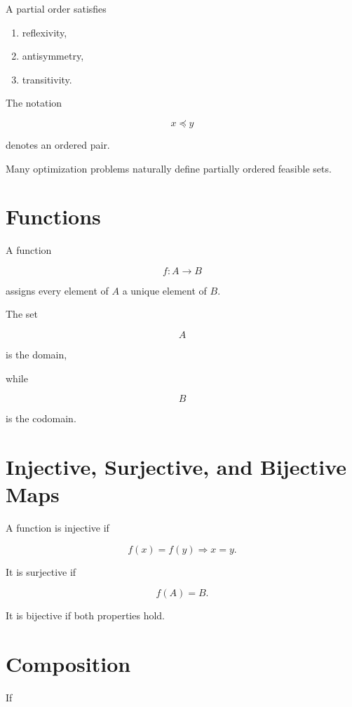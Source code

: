 \documentclass[11pt,fleqn]{book}
\numberwithin{equation}{chapter}
\theoremstyle{plain}
\theoremstyle{definition}
\theoremstyle{remark}
\begin{document}
A partial order satisfies

\begin{enumerate}
\item reflexivity,
\item antisymmetry,
\item transitivity.
\end{enumerate}

The notation

\[
x\preceq y
\]

denotes an ordered pair.

Many optimization problems naturally define partially ordered feasible
sets.


\section{Functions}

A function

\[
f:A\rightarrow B
\]

assigns every element of $A$ a unique element of $B$.

The set

\[
A
\]

is the domain,

while

\[
B
\]

is the codomain.


\section{Injective, Surjective, and Bijective Maps}

A function is injective if

\[
f(x)=f(y)
\Longrightarrow
x=y.
\]

It is surjective if

\[
f(A)=B.
\]

It is bijective if both properties hold.


\section{Composition}

If
\end{document}
